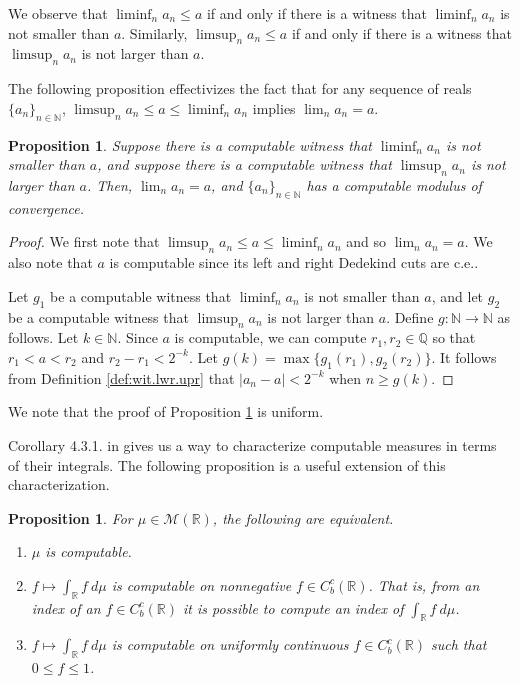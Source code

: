 \documentclass{amsart}
\newcommand{\Q}{\mathbb{Q}}
\newcommand{\R}{\mathbb{R}}
\newcommand{\N}{\mathbb{N}}
\newcommand{\M}{\mathcal{M}}
\newtheorem{proposition}[theorem]{Proposition}
\theoremstyle{definition}
\numberwithin{equation}{section}
\begin{document}
We observe that $\liminf_n a_n \leq a$ if and only if there is a witness that $\liminf_n a_n$ is not smaller than $a$.   
Similarly, $\limsup_n a_n \leq a$ if and only if there is a witness that $\limsup_n a_n$ is not larger than $a$. 

The following proposition effectivizes the fact that for any sequence of reals $\{a_n\}_{n\in\N}$, $\limsup_n a_n\leq a \leq \liminf_n a_n$ implies $\lim_n a_n=a$. 

\begin{proposition}\label{prop:wit.2.mod}
Suppose there is a computable witness that $\liminf_n a_n$ is not smaller than $a$, and suppose there is a computable
witness that $\limsup_n a_n$ is not larger than $a$.  Then, $\lim_n a_n = a$, and $\{a_n\}_{n \in \N}$ has a computable modulus of convergence.
\end{proposition}

\begin{proof}
We first note that $\limsup_n a_n \leq a \leq \liminf_n a_n$ and so $\lim_n a_n= a$.  We also note that $a$ is computable since its left and right Dedekind cuts are c.e..

Let $g_1$ be a computable witness that $\liminf_n a_n$ is not smaller than $a$, and let 
$g_2$ be a computable witness that $\limsup_n a_n$ is not larger than $a$.  Define $g : \N \rightarrow \N$ as follows.
Let $k \in \N$.  Since $a$ is computable, we can compute $r_1, r_2 \in \Q$ so that $r_1 < a < r_2$ and $r_2 - r_1 < 2^{-k}$.  Let $g(k) = \max\{g_1(r_1), g_2(r_2)\}$.  It follows from Definition \ref{def:wit.lwr.upr} that $|a_n - a| < 2^{-k}$ when $n \geq g(k)$.
\end{proof}

We note that the proof of Proposition \ref{prop:wit.2.mod} is uniform.

Corollary 4.3.1. in \cite{HR09b} gives us a way to characterize computable measures in terms of their integrals. 
The following proposition is a useful extension of this characterization.

\begin{proposition}\label{prop:comp.equiv}
For $\mu\in\M(\R)$, the following are equivalent.
\begin{enumerate}
	\item $\mu$ is computable.\label{prop:comp.equiv::mc}
	
	\item $f\mapsto\int_{\R}f\ d\mu$ is computable on nonnegative $f\in C^c_b(\R)$.  That is, from an index of an $f \in C^c_b(\R)$ it is possible to compute an index of $\int_\R f\ d\mu$.  \label{prop:comp.equiv::ic}
	
	\item $f\mapsto\int_{\R}f\ d\mu$ is computable on uniformly continuous $f\in C^c_b(\R)$ such that $0\leq f\leq1$.
	\label{prop:comp.equiv::iucc}
\end{enumerate}
\end{proposition}
\end{document}

